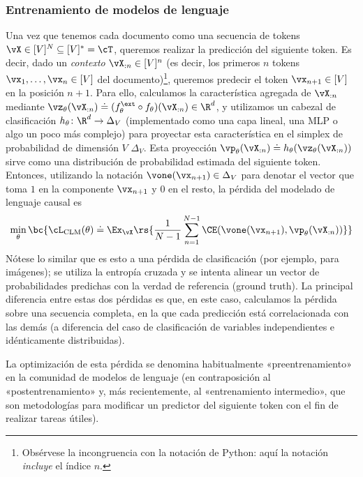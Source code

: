\documentclass[../../book-main_es.tex]{subfiles}
\begin{document}
\subsubsection{Entrenamiento de modelos de lenguaje}

Una vez que tenemos cada documento como una secuencia de tokens \(\vX \in [V]^{N}
\subseteq [V]^{*} = \cT\), queremos realizar la predicción del siguiente token.
Es decir, dado un \textit{contexto} \(\vX_{:n} \in [V]^{n}\) (es decir, los
primeros \(n\) tokens \(\vx_{1}, \dots, \vx_{n} \in [V]\) del
documento)\footnote{Obsérvese la incongruencia con la notación de Python: aquí
la notación \textit{incluye} el índice \(n\).}, queremos predecir el
token \(\vx_{n + 1} \in [V]\) en la posición \(n + 1\). Para ello,
calculamos la característica agregada de \(\vX_{:n}\) mediante
\(\vz_{\theta}(\vX_{:n}) \doteq (f_{\theta}^{\ext} \circ
f_{\theta})(\vX_{:n}) \in \R^{d}\), y utilizamos un cabezal de clasificación
\(h_{\theta} \colon \R^{d} \to \Delta_{V}\) (implementado como una
capa lineal, una MLP o algo un poco más complejo) para proyectar
esta característica en el simplex de probabilidad de dimensión \(V\)
\(\Delta_{V}\). Esta proyección \(\vp_{\theta}(\vX_{:n}) \doteq
h_{\theta}(\vz_{\theta}(\vX_{:n}))\) sirve como una distribución de probabilidad estimada
del siguiente token. Entonces, utilizando la notación
\(\vone(\vx_{n + 1}) \in \Delta_{V}\) para denotar el vector que toma \(1\) en la componente \(\vx_{n +
1}\) y \(0\) en el resto, la pérdida del modelado de lenguaje causal es
\begin{equation}\label{eq:clm_loss}
\min_{\theta}\bc{\cL_{\mathrm{CLM}}(\theta) \doteq
    \Ex_{\vX}\rs{\frac{1}{N - 1}\sum_{n = 1}^{N - 1}\CE(\vone(\vx_{n +
1}), \vp_{\theta}(\vX_{:n}))}}
\end{equation}
Nótese lo similar que es esto a una pérdida de clasificación (por ejemplo, para imágenes);
se utiliza la entropía cruzada y se intenta alinear un vector de probabilidades
predichas con la verdad de referencia (ground truth). La principal diferencia entre estas dos
pérdidas es que, en este caso, calculamos la pérdida sobre una secuencia completa,
en la que cada predicción está correlacionada con las demás (a diferencia del
caso de clasificación de variables independientes e idénticamente distribuidas).

La optimización de esta pérdida se denomina habitualmente «preentrenamiento» en la
comunidad de modelos de lenguaje (en contraposición al «postentrenamiento» y, más
recientemente, al «entrenamiento intermedio», que son metodologías para modificar un
predictor del siguiente token con el fin de realizar tareas útiles).
\end{document}
